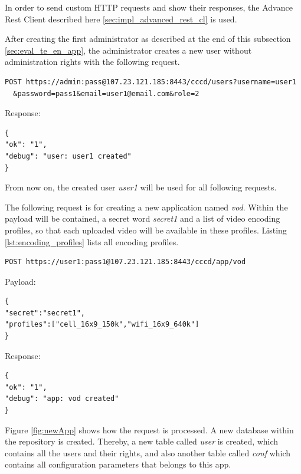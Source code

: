 In order to send custom \ac{HTTP} requests and show their responses, the Advance Rest Client described here \ref{sec:impl_advanced_rest_cl} is used.

After creating the first administrator as described at the end of this subsection \ref{sec:eval_te_en_app}, the administrator creates a new user without administration rights with the following request.
\begin{code}
\begin{verbatim}
POST https://admin:pass@107.23.121.185:8443/cccd/users?username=user1
  &password=pass1&email=user1@email.com&role=2
\end{verbatim}
Response:
\begin{verbatim}
{
"ok": "1",
"debug": "user: user1 created"
}
\end{verbatim}
\end{code}

From now on, the created user \textit{user1} will be used for all following requests.

The following request is for creating a new application named \textit{vod}. Within the payload will be contained, a secret word \textit{secret1} and a list of video encoding profiles, so that each uploaded video will be available in these profiles. Listing \ref{lst:encoding_profiles} lists all encoding profiles.

\begin{code}
\begin{verbatim}
POST https://user1:pass1@107.23.121.185:8443/cccd/app/vod
\end{verbatim}
Payload:
\begin{verbatim}
{
"secret":"secret1",
"profiles":["cell_16x9_150k","wifi_16x9_640k"]
}
\end{verbatim}
Response:
\begin{verbatim}
{
"ok": "1",
"debug": "app: vod created"
}
\end{verbatim}
\end{code}
 
Figure \ref{fig:newApp} shows how the request is processed. A new database within the repository is created. Thereby, a new table called \textit{user} is created, which contains all the users and their rights, and also another table called \textit{conf} which contains all configuration parameters that belongs to this app.

